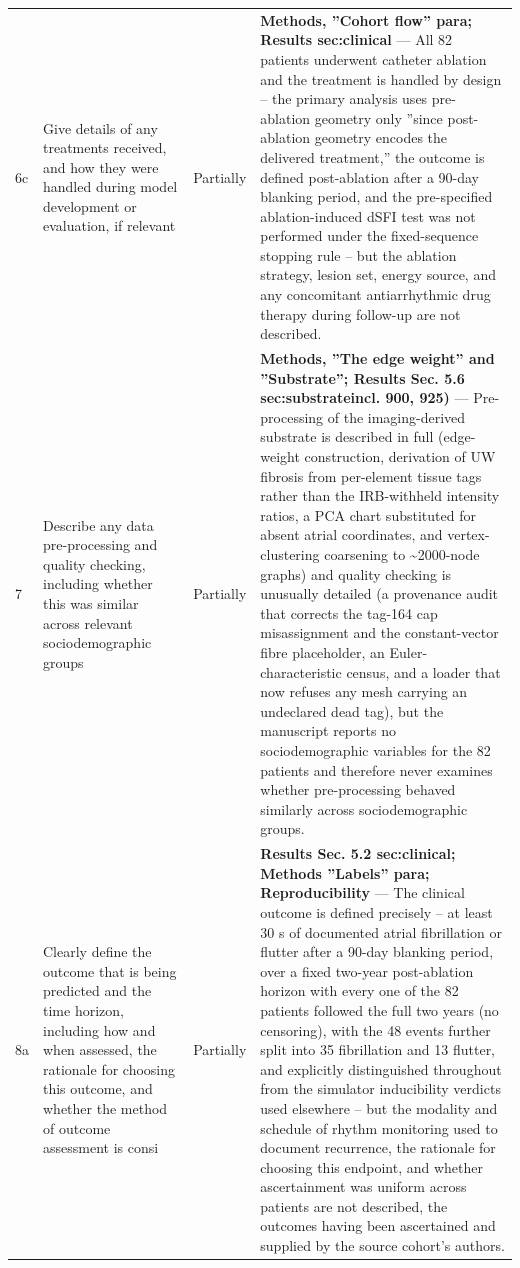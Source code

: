 \documentclass[10pt]{article}
\begin{document}
\begin{longtable}{@{}p{0.9cm} p{6.2cm} p{1.9cm} p{12.4cm}@{}}
6c & Give details of any treatments received, and how they were handled during model development or evaluation, if relevant & Partially & \textbf{Methods, ''Cohort flow'' para; Results sec:clinical} --- All 82 patients underwent catheter ablation and the treatment is handled by design -- the primary analysis uses pre-ablation geometry only ''since post-ablation geometry encodes the delivered treatment,'' the outcome is defined post-ablation after a 90-day blanking period, and the pre-specified ablation-induced dSFI test was not performed under the fixed-sequence stopping rule -- but the ablation strategy, lesion set, energy source, and any concomitant antiarrhythmic drug therapy during follow-up are not described. \\[2pt]
7 & Describe any data pre-processing and quality checking, including whether this was similar across relevant sociodemographic groups & Partially & \textbf{Methods, ''The edge weight'' and ''Substrate''; Results Sec. 5.6 sec:substrateincl. 900, 925)} --- Pre-processing of the imaging-derived substrate is described in full (edge-weight construction, derivation of UW fibrosis from per-element tissue tags rather than the IRB-withheld intensity ratios, a PCA chart substituted for absent atrial coordinates, and vertex-clustering coarsening to \textasciitilde{}2000-node graphs) and quality checking is unusually detailed (a provenance audit that corrects the tag-164 cap misassignment and the constant-vector fibre placeholder, an Euler-characteristic census, and a loader that now refuses any mesh carrying an undeclared dead tag), but the manuscript reports no sociodemographic variables for the 82 patients and therefore never examines whether pre-processing behaved similarly across sociodemographic groups. \\[2pt]
8a & Clearly define the outcome that is being predicted and the time horizon, including how and when assessed, the rationale for choosing this outcome, and whether the method of outcome assessment is consi & Partially & \textbf{Results Sec. 5.2 sec:clinical; Methods ''Labels'' para; Reproducibility} --- The clinical outcome is defined precisely -- at least 30 s of documented atrial fibrillation or flutter after a 90-day blanking period, over a fixed two-year post-ablation horizon with every one of the 82 patients followed the full two years (no censoring), with the 48 events further split into 35 fibrillation and 13 flutter, and explicitly distinguished throughout from the simulator inducibility verdicts used elsewhere -- but the modality and schedule of rhythm monitoring used to document recurrence, the rationale for choosing this endpoint, and whether ascertainment was uniform across patients are not described, the outcomes having been ascertained and supplied by the source cohort's authors. \\[2pt]

\end{longtable}
\end{document}

